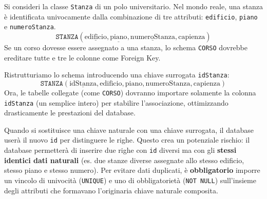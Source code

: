 \begin{example}
Si consideri la classe \texttt{Stanza} di un polo universitario. Nel mondo reale, una stanza è identificata univocamente dalla combinazione di tre attributi: \texttt{edificio}, \texttt{piano} e \texttt{numeroStanza}.
$$\texttt{STANZA}(\underline{\text{edificio}}, \underline{\text{piano}}, \underline{\text{numeroStanza}}, \text{capienza})$$
Se un corso dovesse essere assegnato a una stanza, lo schema \texttt{CORSO} dovrebbe ereditare tutte e tre le colonne come Foreign Key.

Ristrutturiamo lo schema introducendo una chiave surrogata \texttt{idStanza}:
$$\texttt{STANZA}(\underline{\text{idStanza}}, \text{edificio}, \text{piano}, \text{numeroStanza}, \text{capienza})$$
Ora, le tabelle collegate (come \texttt{CORSO}) dovranno importare solamente la colonna \texttt{idStanza} (un semplice intero) per stabilire l'associazione, ottimizzando drasticamente le prestazioni del database.
\end{example}

\begin{warningbox}
Quando si sostituisce una chiave naturale con una chiave surrogata, il database userà il nuovo \texttt{id} per distinguere le righe. Questo crea un potenziale rischio: il database permetterà di inserire due righe con \texttt{id} diversi ma con gli \textbf{stessi identici dati naturali} (es. due stanze diverse assegnate allo stesso edificio, stesso piano e stesso numero). 
Per evitare dati duplicati, è \textbf{obbligatorio} imporre un vincolo di univocità (\texttt{UNIQUE}) e uno di obbligatorietà (\texttt{NOT NULL}) sull'insieme degli attributi che formavano l'originaria chiave naturale composita.
\end{warningbox}


